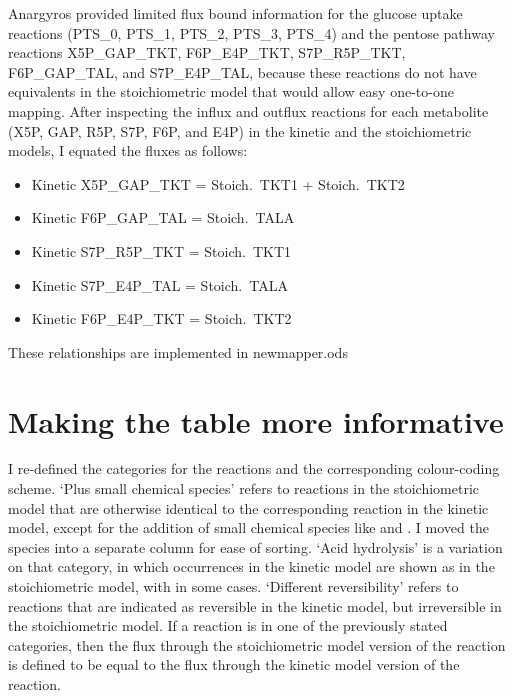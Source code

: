 \documentclass[parskip=full]{scrartcl}
\begin{document}
Anargyros provided limited flux bound information for the glucose uptake reactions (PTS\_0, PTS\_1, PTS\_2, PTS\_3, PTS\_4) and the pentose pathway reactions X5P\_GAP\_TKT, F6P\_E4P\_TKT, S7P\_R5P\_TKT, F6P\_GAP\_TAL, and S7P\_E4P\_TAL, because these reactions do not have equivalents in the stoichiometric model that would allow easy one-to-one mapping. After inspecting the influx and outflux reactions for each metabolite (X5P, GAP, R5P, S7P, F6P, and E4P) in the kinetic and the stoichiometric models, I equated the fluxes as follows:

\begin{itemize}
\item Kinetic X5P\_GAP\_TKT = Stoich.\ TKT1 + Stoich.\ TKT2
\item Kinetic F6P\_GAP\_TAL = Stoich.\ TALA
\item Kinetic S7P\_R5P\_TKT = Stoich.\ TKT1
\item Kinetic S7P\_E4P\_TAL = Stoich.\ TALA
  \item Kinetic F6P\_E4P\_TKT = Stoich.\ TKT2
\end{itemize}

These relationships are implemented in newmapper.ods

\section{Making the table more informative}
\label{sec:moreinformative}

I re-defined the categories for the reactions and the corresponding colour-coding scheme. `Plus small chemical species' refers to reactions in the stoichiometric model that are otherwise identical to the corresponding reaction in the kinetic model, except for the addition of small chemical species like  and . I moved the species into a separate column for ease of sorting. `Acid hydrolysis' is a variation on that category, in which  occurrences in the kinetic model are shown as  in the stoichiometric model, with  in some cases. `Different reversibility' refers to reactions that are indicated as reversible in the kinetic model, but irreversible in the stoichiometric model. If a reaction is in one of the previously stated categories, then the flux through the stoichiometric model version of the reaction is defined to be equal to the flux through the kinetic model version of the reaction.
\end{document}
